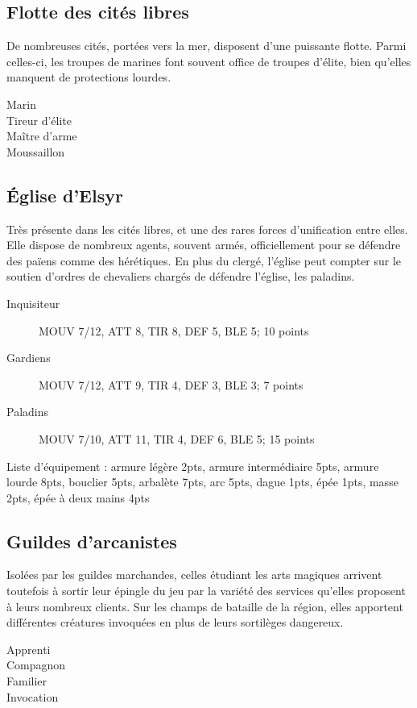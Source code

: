 \documentclass[10pt,a4paper]{article}
\begin{document}
\begin{multicols}{3}
\subsection*{Flotte des cités libres}
De nombreuses cités, portées vers la mer, disposent d'une puissante flotte. Parmi celles-ci, les troupes de marines font souvent office de troupes d'élite, bien qu'elles manquent de protections lourdes.
\begin{description}
\item[Marin]
\item[Tireur d'élite]
\item[Maître d'arme]
\item[Moussaillon]
\end{description}
\subsection*{Église d'Elsyr}
Très présente dans les cités libres, et une des rares forces d'unification entre elles. Elle dispose de nombreux agents, souvent armés, officiellement pour se défendre des païens comme des hérétiques. En plus du clergé, l'église peut compter sur le soutien d'ordres de chevaliers chargés de défendre l'église, les paladins.
\begin{description}
\item[Inquisiteur] MOUV 7/12, ATT 8, TIR 8, DEF 5, BLE 5; 10 points
\item[Gardiens] MOUV 7/12, ATT 9, TIR 4, DEF 3, BLE 3; 7 points
\item[Paladins]MOUV 7/10, ATT 11, TIR 4, DEF 6, BLE 5; 15 points
\end{description}
Liste d'équipement : armure légère 2pts, armure intermédiaire 5pts, armure lourde 8pts, bouclier 5pts, arbalète 7pts, arc 5pts, dague 1pts, épée 1pts, masse 2pts, épée à deux mains 4pts
\subsection*{Guildes d'arcanistes}
Isolées par les guildes marchandes, celles étudiant les arts magiques arrivent toutefois à sortir leur épingle du jeu par la variété des services qu'elles proposent à leurs nombreux clients. Sur les champs de bataille de la région, elles apportent différentes créatures invoquées en plus de leurs sortilèges dangereux.
\begin{description}
\item[Apprenti]
\item[Compagnon]
\item[Familier]
\item[Invocation]
\end{description}
\end{multicols}
\end{document}
